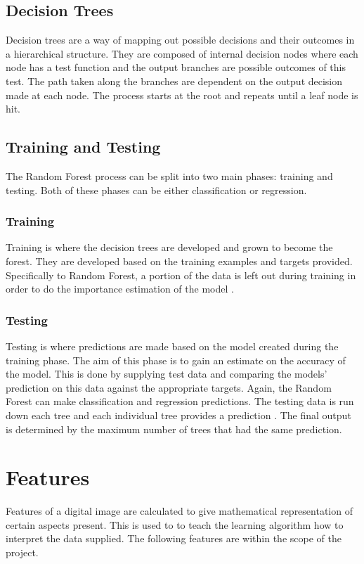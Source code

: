 \subsection{Decision Trees}
Decision trees are a way of mapping out possible decisions and their outcomes in a hierarchical structure. They are composed of internal decision nodes where each node has a test function and the output branches are possible outcomes of this test. The path taken along the branches are dependent on the output decision made at each node. The process starts at the root and repeats until a leaf node is hit. 

\subsection{Training and Testing}
The Random Forest process can be split into two main phases: training and testing. Both of these phases can be either classification or regression. 

\subsubsection{Training}
Training is where the decision trees are developed and grown to become the forest. They are developed based on the training examples and targets provided. Specifically to Random Forest, a portion of the data is left out during training in order to do the importance estimation of the model \cite{ref:rf_1}.  

\subsubsection{Testing}
Testing is where predictions are made based on the model created during the training phase. The aim of this phase is to gain an estimate on the accuracy of the model. This is done by supplying test data and comparing the models' prediction on this data against the appropriate targets. Again, the Random Forest can make classification and regression predictions. The testing data is run down each tree and each individual tree provides a prediction \cite{ref:rf_1}. The final output is determined by the maximum number of trees that had the same prediction. 
 
\section{Features}
Features of a digital image are calculated to give mathematical representation of certain aspects present. This is used to to teach the learning algorithm how to interpret the data supplied. The following features are within the scope of the project. 
